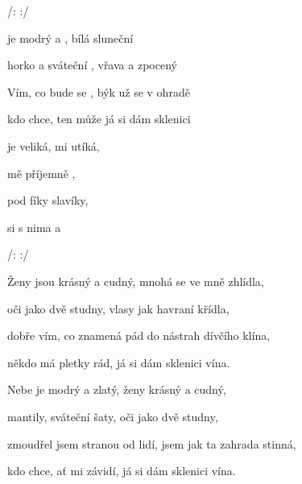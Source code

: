 

/:     :/

\zs
{} je modrý a , bílá sluneční 

horko a sváteční , vřava a zpocený 

Vím, co bude se , býk už se v ohradě 

kdo chce, ten může  já si dám sklenici   
\ks

\zr
{} je veliká,  mi utíká,

 mě příjemně , 

 pod fíky  slavíky,

 si s nima a  

/:     :/

\kr

\zs
Ženy jsou krásný a cudný, mnohá se ve mně zhlídla,

oči jako dvě studny, vlasy jak havraní křídla,

dobře vím, co znamená pád do nástrah dívčího klína,

někdo má pletky rád, já si dám sklenici vína.
\ks

\zr  \kr

\zs
Nebe je modrý a zlatý, ženy krásný a cudný,

mantily, sváteční šaty, oči jako dvě studny,

zmoudřel jsem stranou od lidí, jsem jak ta zahrada stinná,

kdo chce, ať mi závidí, já si dám sklenici vína.
\ks

\zr  \kr

\kp





















